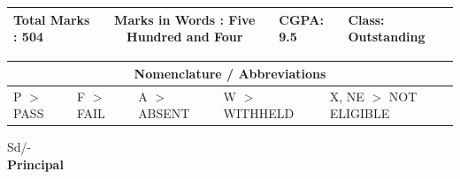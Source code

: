 \documentclass[a4paper,12pt]{article}
\begin{document}
\begin{center}
\begin{tabular}{|m{3cm}|m{6cm}|m{3cm}|m{2cm}|m{4cm}|}
\hline
    \textbf{Total Marks} : 504 & \multicolumn{2}{|c|}{\textbf{Marks in Words} : Five Hundred and Four} & \textbf{CGPA}: 9.5 & \textbf{Class}: Outstanding \\
\hline
\end{tabular}
\end{center}

\begin{center}
\begin{tabular}{|m{3cm}|m{3cm}|m{3cm}|m{3cm}|m{4cm}|}
\hline
\multicolumn{5}{|c|}{\textbf{Nomenclature / Abbreviations}} \\
\hline
P $>$ PASS & F $>$ FAIL & A $>$ ABSENT & W $>$ WITHHELD & X, NE $>$ NOT ELIGIBLE \\
\hline
\end{tabular}
\end{center}

\vspace{3cm}
\begin{flushright}
    Sd/- \\
    \textbf{Principal}
\end{flushright}

\vspace{0.5cm}
\noindent
\vfill
\end{document}

